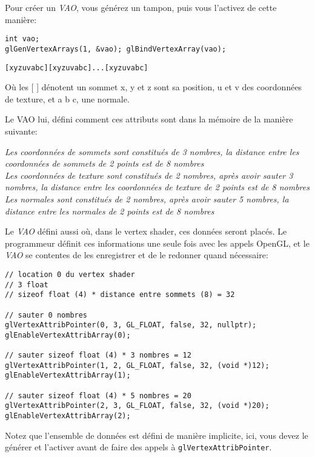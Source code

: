 \documentclass[pdftex, 11pt, a4paper, titlepage]{article}
\begin{document}
Pour créer un \emph{VAO}, vous générez un tampon, puis vous l'activez de
cette manière:

\begin{lstlisting}
int vao;
glGenVertexArrays(1, &vao); glBindVertexArray(vao);
\end{lstlisting}


\begin{alltt}
[x y z u v a b c][x y z u v a b c]...[x y z u v a b c]
\end{alltt}
Où les [ ] dénotent un sommet x, y et z sont sa position, u et v des
coordonnées de texture, et a b c, une normale.

Le VAO lui, défini comment ces attributs sont dans la mémoire de la
manière suivante:

\emph{Les coordonnées de sommets sont constitués de 3 nombres, la
  distance entre les coordonnées de sommets de 2 points est de 8
  nombres\\}
\emph{Les coordonnées de texture sont constitués de 2
  nombres, après avoir sauter 3 nombres, la distance entre les
  coordonnées de texture de 2 points est de 8 nombres\\}
\emph{Les normales sont constitués de 2 nombres, après avoir sauter
 5 nombres, la distance entre les normales de 2 points est de 8
 nombres\\}

\pagebreak

Le \emph{VAO} défini aussi où, dans le vertex shader, ces données seront
placés.  Le programmeur définit ces informations une seule fois avec
les appels OpenGL, et le \emph{VAO} se contentes de les enregistrer et de le
redonner quand nécessaire:

\begin{lstlisting}
// location 0 du vertex shader
// 3 float
// sizeof float (4) * distance entre sommets (8) = 32

// sauter 0 nombres
glVertexAttribPointer(0, 3, GL_FLOAT, false, 32, nullptr);
glEnableVertexAttribArray(0);

// sauter sizeof float (4) * 3 nombres = 12
glVertexAttribPointer(1, 2, GL_FLOAT, false, 32, (void *)12);
glEnableVertexAttribArray(1);

// sauter sizeof float (4) * 5 nombres = 20 
glVertexAttribPointer(2, 3, GL_FLOAT, false, 32, (void *)20);
glEnableVertexAttribArray(2);
\end{lstlisting}

Notez que l'ensemble de données est défini de manière implicite, ici,
vous devez le générer et l'activer avant de faire des appels à
\texttt{glVertexAttribPointer}.
\end{document}
